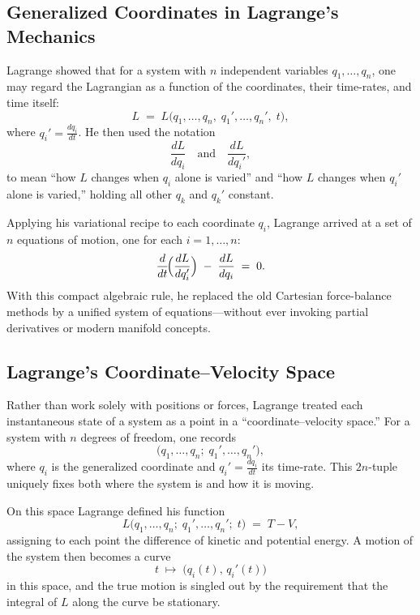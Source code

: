    





\subsection{Generalized Coordinates in Lagrange’s Mechanics}

Lagrange showed that for a system with \(n\) independent variables \(q_1,\dots,q_n\), one may regard the Lagrangian as a function of the coordinates, their time-rates, and time itself:
\[
L \;=\; L\bigl(q_1,\dots,q_n,\;q_1',\dots,q_n',\;t\bigr),
\]
where \(q_i'=\tfrac{dq_i}{dt}\).  He then used the notation
\[
\frac{dL}{dq_i}
\quad\text{and}\quad
\frac{dL}{dq_i'},
\]
to mean “how \(L\) changes when \(q_i\) alone is varied” and “how \(L\) changes when \(q_i'\) alone is varied,” holding all other \(q_k\) and \(q_k'\) constant.

Applying his variational recipe to each coordinate \(q_i\), Lagrange arrived at a set of \(n\) equations of motion, one for each \(i=1,\dots,n\):
\[
\frac{d}{dt}\!\Bigl(\frac{dL}{dq_i'}\Bigr)
\;-\;
\frac{dL}{dq_i}
\;=\;
0.
\]
With this compact algebraic rule, he replaced the old Cartesian force-balance methods by a unified system of equations—without ever invoking partial derivatives or modern manifold concepts.  



\subsection{Lagrange’s Coordinate–Velocity Space}

Rather than work solely with positions or forces, Lagrange treated each instantaneous state of a system as a point in a “coordinate–velocity space.”  For a system with \(n\) degrees of freedom, one records
\[
\bigl(q_1,\dots,q_n;\;q_1',\dots,q_n'\bigr),
\]
where \(q_i\) is the generalized coordinate and \(q_i'=\tfrac{dq_i}{dt}\) its time‐rate.  This \(2n\)-tuple uniquely fixes both where the system is and how it is moving.

\medskip

On this space Lagrange defined his function
\[
L\bigl(q_1,\dots,q_n;\;q_1',\dots,q_n';\;t\bigr)
\;=\;
T-V,
\]
assigning to each point the difference of kinetic and potential energy.  A motion of the system then becomes a curve
\[
t\;\longmapsto\;\bigl(q_i(t),\,q_i'(t)\bigr)
\]
in this space, and the true motion is singled out by the requirement that the integral of \(L\) along the curve be stationary.

